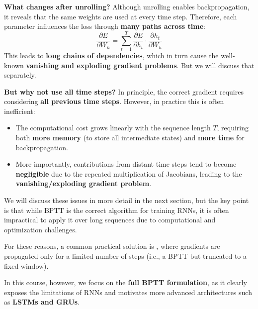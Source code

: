 \begin{deepeningbox}
    \highspace
    \textcolor{DarkOrange3}{ \textbf{What changes after unrolling?}}
    Although unrolling enables backpropagation, it reveals that the same weights are used at every time step. Therefore, each parameter influences the loss through \textbf{many paths across time}:
    \begin{equation*}
        \frac{\partial E}{\partial W_h} = \sum_{t=1}^{T} \frac{\partial E}{\partial h_t} \cdot \frac{\partial h_t}{\partial W_h}
    \end{equation*}
    This leads to \textbf{long chains of dependencies}, which in turn cause the well-known \textbf{vanishing and exploding gradient problems}. But we will discuss that separately.

    \highspace
    \textcolor{Green3}{ \textbf{But why not use all time steps?}} 
    In principle, the correct gradient requires considering \textbf{all previous time steps}. However, in practice this is often inefficient:
    \begin{itemize}
        \item The computational cost grows linearly with the sequence length $T$, requiring both \textbf{more memory} (to store all intermediate states) and \textbf{more time} for backpropagation.
        \item More importantly, contributions from distant time steps tend to become \textbf{negligible} due to the repeated multiplication of Jacobians, leading to the \textbf{vanishing/exploding gradient problem}.
    \end{itemize}
    We will discuss these issues in more detail in the next section, but the key point is that while BPTT is the correct algorithm for training RNNs, it is often impractical to apply it over long sequences due to computational and optimization challenges.

    \highspace
    For these reasons, a common practical solution is , where gradients are propagated only for a limited number of steps (i.e., a BPTT but truncated to a fixed window).

    \highspace
    In this course, however, we focus on the \textbf{full BPTT formulation}, as it clearly exposes the limitations of RNNs and motivates more advanced architectures such as \textbf{LSTMs and GRUs}.
\end{deepeningbox}